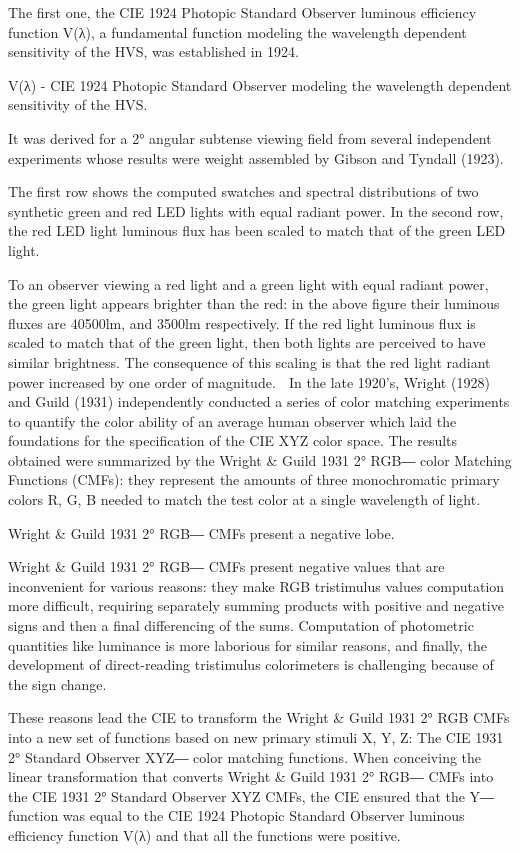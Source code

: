 The first one, the CIE 1924 Photopic Standard Observer luminous efficiency function V(λ), a fundamental function modeling the wavelength dependent sensitivity of the HVS, was established in 1924.

V(λ) - CIE 1924 Photopic Standard Observer modeling the wavelength dependent sensitivity of the HVS.

It was derived for a 2° angular subtense viewing field from several independent experiments whose results were weight assembled by Gibson and Tyndall (1923).

The first row shows the computed swatches and spectral distributions of two synthetic green and red LED lights with equal radiant power. In the second row, the red LED light luminous flux has been scaled to match that of the green LED light.

To an observer viewing a red light and a green light with equal radiant power, the green light appears brighter than the red: in the above figure their luminous fluxes are 40500lm, and 3500lm respectively. If the red light luminous flux is scaled to match that of the green light, then both lights are perceived to have similar brightness. The consequence of this scaling is that the red light radiant power increased by one order of magnitude.

In the late 1920's, Wright (1928) and Guild (1931) independently conducted a series of color matching experiments to quantify the color ability of an average human observer which laid the foundations for the specification of the CIE XYZ color space. The results obtained were summarized by the Wright & Guild 1931 2° RGB― color Matching Functions (CMFs): they represent the amounts of three monochromatic primary colors R, G, B needed to match the test color at a single wavelength of light.


Wright & Guild 1931 2° RGB― CMFs present a negative lobe.

Wright & Guild 1931 2° RGB― CMFs present negative values that are inconvenient for various reasons: they make RGB tristimulus values computation more difficult, requiring separately summing products with positive and negative signs and then a final differencing of the sums. Computation of photometric quantities like luminance is more laborious for similar reasons, and finally, the development of direct-reading tristimulus colorimeters is challenging because of the sign change.

These reasons lead the CIE to transform the Wright & Guild 1931 2° RGB CMFs into a new set of functions based on new primary stimuli X, Y, Z: The CIE 1931 2° Standard Observer XYZ― color matching functions. When conceiving the linear transformation that converts Wright & Guild 1931 2° RGB― CMFs into the CIE 1931 2° Standard Observer XYZ CMFs, the CIE ensured that the Y― function was equal to the CIE 1924 Photopic Standard Observer luminous efficiency function V(λ) and that all the functions were positive.
 

